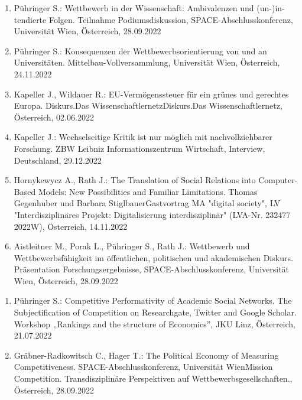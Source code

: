 \begin{enumerate}
	\item Pühringer S.: Wettbewerb in der Wissenschaft: Ambivalenzen und (un-)in-tendierte Folgen. Teilnahme Podiumsdiskussion, SPACE-Abschlusskonferenz, Universität Wien, Österreich, 28.09.2022
	\item Pühringer S.: Konsequenzen der Wettbewerbsorientierung von und an Universitäten. Mittelbau-Vollversammlung, Universität Wien, Österreich, 24.11.2022
	\item Kapeller J., Wildauer R.: EU-Vermögenssteuer für ein grünes und gerechtes Europa. Diskurs.Das WissenschaftlernetzDiskurs.Das Wissenschaftlernetz, Österreich, 02.06.2022
	\item Kapeller J.: Wechselseitige Kritik ist nur möglich mit nachvollziehbarer Forschung. ZBW Leibniz Informationszentrum Wirtschaft, Interview, Deutschland, 29.12.2022
	\item Hornykewycz A., Rath J.: The Translation of Social Relations into Computer-Based Models: New Possibilities and Familiar Limitations. Thomas Gegenhuber und Barbara StiglbauerGastvortrag MA "digital society", LV "Interdisziplinäres Projekt: Digitalisierung interdisziplinär" (LVA-Nr. 232477 2022W), Österreich, 14.11.2022
	\item Aistleitner M., Porak L., Pühringer S., Rath J.: Wettbewerb und Wettbewerbsfähigkeit im öffentlichen, politischen und akademischen Diskurs. Präsentation Forschungsergebnisse, SPACE-Abschlusskonferenz, Universität Wien, Österreich, 28.09.2022
\end{enumerate}

\begin{enumerate}
	\item Pühringer S.: Competitive Performativity of Academic Social Networks. The Subjectification of Competition on Researchgate, Twitter and Google Scholar. Workshop „Rankings and the structure of Economics”, JKU Linz, Österreich, 21.07.2022
	\item Gräbner-Radkowitsch C., Hager T.: The Political Economy of Measuring Competitiveness. SPACE-Abschlusskonferenz, Universität WienMission Competition. Transdisziplinäre Perspektiven auf Wettbewerbsgesellschaften., Österreich, 28.09.2022
\end{enumerate}

